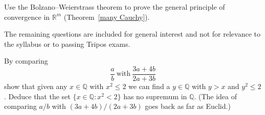 \begin{question}
Use the Bolzano--Weierstrass theorem to prove 
the general principle of convergence in ${\mathbb R}^{m}$
(Theorem~\ref{many Cauchy}).
\end{question}

\vspace{1\baselineskip}

The remaining questions are included for general interest
and not for relevance to the syllabus or to passing Tripos exams.

\vspace{1\baselineskip}

\begin{question}\label{square supremum} By comparing
\[\frac{a}{b}\ \text{with}\ \frac{3a+4b}{2a+3b}\]
show that given any $x\in{\mathbb Q}$ with $x^{2}\leq 2$
we can find a $y\in{\mathbb Q}$ with $y>x$ and $y^{2}\leq 2$.
Deduce that
the set $\{x\in{\mathbb Q}:x^{2}<2\}$ has no supremum
in ${\mathbb Q}$. (The idea of comparing $a/b$ with
$(3a+4b)/(2a+3b)$ goes back as far as Euclid.)
\end{question}


\vspace{1\baselineskip}

